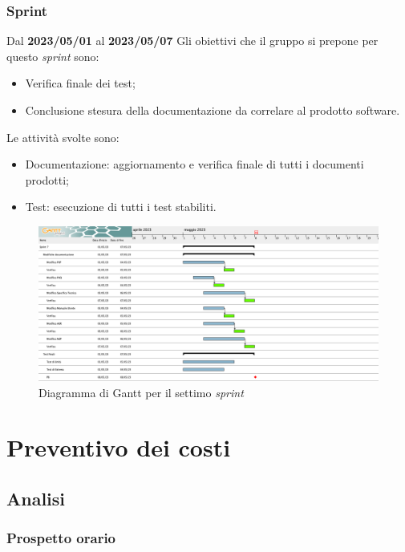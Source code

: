 \subsubsection{ Sprint}
Dal \textbf{2023/05/01} al \textbf{2023/05/07}
\newline
Gli obiettivi che il gruppo si prepone per questo \textit{sprint} sono:
\begin{itemize}
    \item Verifica finale dei test;
    \item Conclusione stesura della documentazione da correlare al prodotto software.
\end{itemize}
Le attività svolte sono:
\begin{itemize}
    \item Documentazione: aggiornamento e verifica finale di tutti i documenti prodotti;
    \item Test: esecuzione di tutti i test stabiliti.
\end{itemize}
\begin{figure}[H]
    \centering
    \includegraphics[width=\textwidth]{src/img/Sprint 7.png}
    \caption{Diagramma di Gantt per il settimo \textit{sprint}}
\end{figure}


\section{Preventivo dei costi}
\subsection{Analisi}
\subsubsection{Prospetto orario}
\renewcommand{\arraystretch}{1.8}

